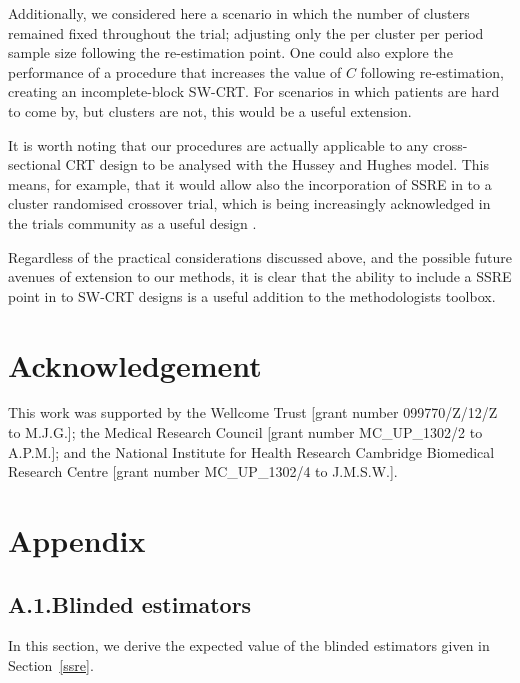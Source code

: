 \documentclass{article}
\begin{document}
Additionally, we considered here a scenario in which the number of clusters remained fixed throughout the trial; adjusting only the per cluster per period sample size following the re-estimation point. One could also explore the performance of a procedure that increases the value of $C$ following re-estimation, creating an incomplete-block SW-CRT. For scenarios in which patients are hard to come by, but clusters are not, this would be a useful extension.

It is worth noting that our procedures are actually applicable to any cross-sectional CRT design to be analysed with the Hussey and Hughes model. This means, for example, that it would allow also the incorporation of SSRE in to a cluster randomised crossover trial, which is being increasingly acknowledged in the trials community as a useful design \citep{arnup2014}.

Regardless of the practical considerations discussed above, and the possible future avenues of extension to our methods, it is clear that the ability to include a SSRE point in to SW-CRT designs is a useful addition to the methodologists toolbox.

\section{Acknowledgement}
	This work was supported by the Wellcome Trust [grant number 099770/Z/12/Z to M.J.G.]; the Medical Research Council [grant number MC\_UP\_1302/2 to A.P.M.]; and the National Institute for Health Research Cambridge Biomedical Research Centre [grant number MC\_UP\_1302/4 to J.M.S.W.].
\vspace*{1pc}



\section*{Appendix}

\subsection*{A.1.\enspace Blinded estimators}

In this section, we derive the expected value of the blinded estimators given in Section~\ref{ssre}.
\end{document}
